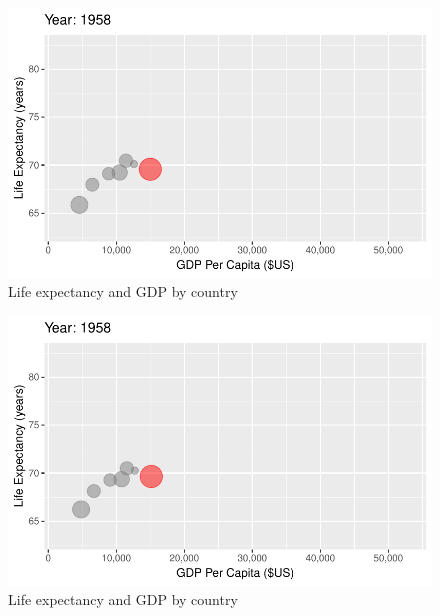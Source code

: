 \documentclass[
  letterpaper,
  DIV=11,
  numbers=noendperiod]{scrreport}
\theoremstyle{definition}
\theoremstyle{remark}
\begin{document}
\begin{figure}

{\centering \includegraphics{index_files/figure-pdf/fig-anim-country-11.pdf}

}

\caption{\label{fig-anim-country-11}Life expectancy and GDP by country}

\end{figure}

\begin{figure}

{\centering \includegraphics{index_files/figure-pdf/fig-anim-country-12.pdf}

}

\caption{\label{fig-anim-country-12}Life expectancy and GDP by country}

\end{figure}
\end{document}
